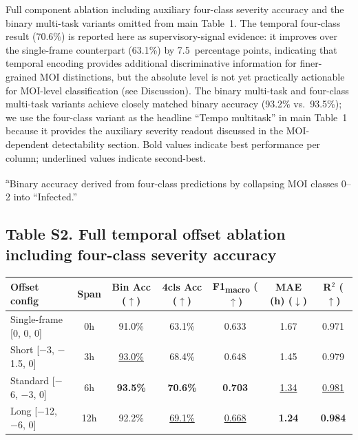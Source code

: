 \documentclass[12pt,letterpaper]{article}
\begin{document}
Full component ablation including auxiliary four-class severity accuracy and the binary multi-task variants omitted from main Table~1. The temporal four-class result (70.6\%) is reported here as supervisory-signal evidence: it improves over the single-frame counterpart (63.1\%) by 7.5~percentage points, indicating that temporal encoding provides additional discriminative information for finer-grained MOI distinctions, but the absolute level is not yet practically actionable for MOI-level classification (see Discussion). The binary multi-task and four-class multi-task variants achieve closely matched binary accuracy (93.2\% vs.\ 93.5\%); we use the four-class variant as the headline ``Tempo multitask'' in main Table~1 because it provides the auxiliary severity readout discussed in the MOI-dependent detectability section. Bold values indicate best performance per column; underlined values indicate second-best.

\textsuperscript{a}Binary accuracy derived from four-class predictions by collapsing MOI classes 0--2 into ``Infected.''

\newpage

\subsection*{Table S2. Full temporal offset ablation including four-class severity accuracy}

\begin{tabular}{lcccccc}
\toprule
\textbf{Offset config} & \textbf{Span} & \textbf{Bin Acc ($\uparrow$)} & \textbf{4cls Acc ($\uparrow$)} & \textbf{F1\textsubscript{macro} ($\uparrow$)} & \textbf{MAE (h) ($\downarrow$)} & \textbf{R$^2$ ($\uparrow$)} \\
\midrule
Single-frame [0, 0, 0]   & 0h  & 91.0\%             & 63.1\%             & 0.633             & 1.67             & 0.971           \\
Short [$-$3, $-$1.5, 0]  & 3h  & \underline{93.0\%} & 68.4\%             & 0.648             & 1.45             & 0.979           \\
Standard [$-$6, $-$3, 0] & 6h  & \textbf{93.5\%}    & \textbf{70.6\%}    & \textbf{0.703}    & \underline{1.34} & \underline{0.981} \\
Long [$-$12, $-$6, 0]    & 12h & 92.2\%             & \underline{69.1\%} & \underline{0.668} & \textbf{1.24}    & \textbf{0.984}  \\
\bottomrule
\end{tabular}
\end{document}
